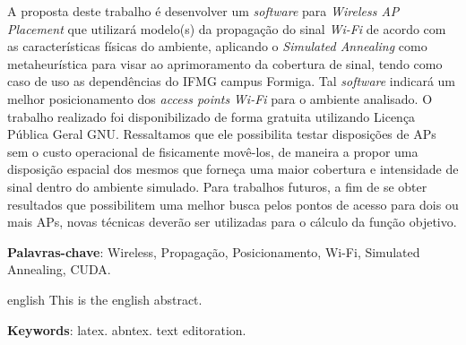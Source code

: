 \documentclass[
	12pt,				%
	openright,			%
	twoside,			%
	a4paper,			%
	english,			%
	french,				%
	spanish,			%
	brazil				%
	]{abntex2}
\begin{document}
\setlength{\absparsep}{18pt} %
\begin{resumo}
A proposta deste trabalho é desenvolver um \textit{software} para \textit{Wireless AP Placement}  que utilizará modelo(s) da propagação do sinal \textit{Wi-Fi} de acordo com as características físicas do ambiente, aplicando o \textit{Simulated Annealing} como metaheurística para visar ao aprimoramento da cobertura de sinal, tendo como caso de uso as dependências do IFMG campus Formiga. Tal \textit{software} indicará um melhor posicionamento dos \textit{access points} \textit{Wi-Fi} para o ambiente analisado. O trabalho realizado foi disponibilizado de forma gratuita utilizando Licença Pública Geral GNU. Ressaltamos que ele possibilita testar disposições de APs sem o custo operacional de fisicamente movê-los, de maneira a propor uma disposição espacial dos mesmos que forneça uma maior cobertura e intensidade de sinal dentro do ambiente simulado. Para trabalhos futuros, a fim de se obter resultados que possibilitem uma melhor busca pelos pontos de acesso para dois ou mais APs, novas técnicas deverão ser utilizadas para o cálculo da função objetivo. 

 \textbf{Palavras-chave}:  Wireless, Propagação, Posicionamento, Wi-Fi, Simulated Annealing, CUDA.
\end{resumo}

\begin{resumo}[Abstract]
 \begin{otherlanguage*}{english}
   This is the english abstract.

   \vspace{\onelineskip}
 
   \noindent 
   \textbf{Keywords}: latex. abntex. text editoration.
 \end{otherlanguage*}
\end{resumo}

% 

%  
\end{document}
